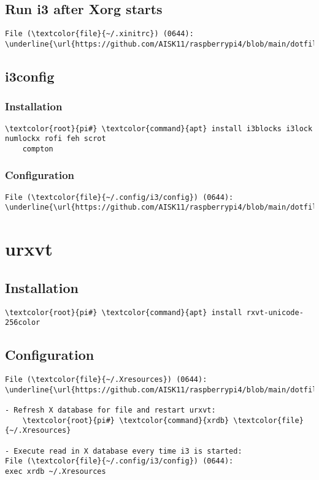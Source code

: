 \documentclass[10pt, a4paper, onecolumn, openany]{book} %
\begin{document}
\subsection{Run i3 after Xorg starts}
\begin{Verbatim}[commandchars=\\\{\}]
File (\textcolor{file}{~/.xinitrc}) (0644):
\underline{\url{https://github.com/AISK11/raspberrypi4/blob/main/dotfiles/.xinitrc}}
\end{Verbatim}

\subsection{i3config}
\subsubsection{Installation}
\begin{Verbatim}[commandchars=\\\{\}]
    \textcolor{root}{pi#} \textcolor{command}{apt} install i3blocks i3lock numlockx rofi feh scrot
    compton
\end{Verbatim}
\subsubsection{Configuration}
\begin{Verbatim}[commandchars=\\\{\}]   
File (\textcolor{file}{~/.config/i3/config}) (0644):
\underline{\url{https://github.com/AISK11/raspberrypi4/blob/main/dotfiles/.config/i3/config}}
\end{Verbatim}

\section{urxvt}
\subsection{Installation}
\begin{Verbatim}[commandchars=\\\{\}]
    \textcolor{root}{pi#} \textcolor{command}{apt} install rxvt-unicode-256color
\end{Verbatim}

\subsection{Configuration}
\begin{Verbatim}[commandchars=\\\{\}]
File (\textcolor{file}{~/.Xresources}) (0644):
\underline{\url{https://github.com/AISK11/raspberrypi4/blob/main/dotfiles/.Xresources}}

- Refresh X database for file and restart urxvt:
    \textcolor{root}{pi#} \textcolor{command}{xrdb} \textcolor{file}{~/.Xresources}

- Execute read in X database every time i3 is started:
File (\textcolor{file}{~/.config/i3/config}) (0644):
exec xrdb ~/.Xresources    
\end{Verbatim}
\end{document}
